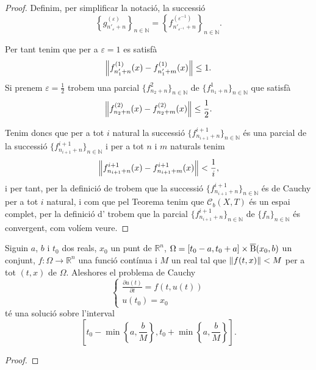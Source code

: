 \documentclass[../Apunts.tex]{subfiles}
\begin{document}
\begin{lemma}
\begin{proof}
			Definim, per simplificar la notació, la successió
			\[\left\{g^{(\varepsilon)}_{n'_{\varepsilon}+n}\right\}_{n\in\mathbb{N}}=\left\{f^{(\varepsilon^{-1})}_{n'_{\varepsilon^{-1}}+n}\right\}_{n\in\mathbb{N}}.\]
			
			Per tant tenim que per a \(\varepsilon=1\) es satisfà
			\[\norm{f^{(1)}_{n'_{1}+n}(x)-f^{(1)}_{n'_{1}+m}(x)}\leq1.\]
			Si prenem \(\varepsilon=\frac{1}{2}\) trobem una parcial \(\{f^{2}_{n_{2}+n}\}_{n\in\mathbb{N}}\) de \(\{f^{1}_{n_{1}+n}\}_{n\in\mathbb{N}}\) que satisfà
			\[\norm{f^{(2)}_{n_{2}+n}(x)-f^{(2)}_{n_{2}+m}(x)}\leq\frac{1}{2}.\]
			
			Tenim doncs que per a tot \(i\) natural la successió \(\{f^{i+1}_{n_{i+1}+n}\}_{n\in\mathbb{N}}\) és una parcial de la successió \(\{f^{i+1}_{n_{i+1}+n}\}_{n\in\mathbb{N}}\) i per a tot \(n\) i \(m\) naturals tenim
			\[\norm{f^{i+1}_{n_{i+1}+n}(x)-f^{i+1}_{n_{i+1}+m}(x)}<\frac{1}{i},\]
			i per tant, per la definició de  trobem que la successió \(\{f^{i+1}_{n_{i+1}+n}\}_{n\in\mathbb{N}}\) és de Cauchy per a tot \(i\) natural, i com que pel Teorema  tenim que \(\mathcal{C}_{b}(X,T)\) és un espai complet, per la definició d' trobem que la parcial \(\{f^{i+1}_{n_{i+1}+n}\}_{n\in\mathbb{N}}\) de \(\{f_{n}\}_{n\in\mathbb{N}}\) és convergent, com volíem veure.
		\end{proof}
	\end{lemma}
	\begin{theorem}
		\label{thm:Teorema de Peano}
		Siguin \(a\), \(b\) i \(t_{0}\) dos reals, \(x_{0}\) un punt de \(\mathbb{R}^{n}\), \(\Omega=[t_{0}-a,t_{0}+a]\times\overline{\operatorname{B}}(x_{0},b)\) un conjunt, \(f\colon\Omega\longrightarrow\mathbb{R}^{n}\) una funció contínua i \(M\) un real tal que \(\norm{f(t,x)}<M\) per a tot \((t,x)\) de \(\Omega\). Aleshores el problema de Cauchy
		\[\begin{cases*}
			\displaystyle\frac{\partial u(t)}{\partial t}=f(t,u(t)) \\
			\displaystyle u(t_{0})=x_{0}
		\end{cases*}\]
		té una solució sobre l'interval
		\[\left[t_{0}-\min\left\{a,\frac{b}{M}\right\},t_{0}+\min\left\{a,\frac{b}{M}\right\}\right].\]
		\begin{proof}
		\end{proof}
	\end{theorem}
\end{document}
